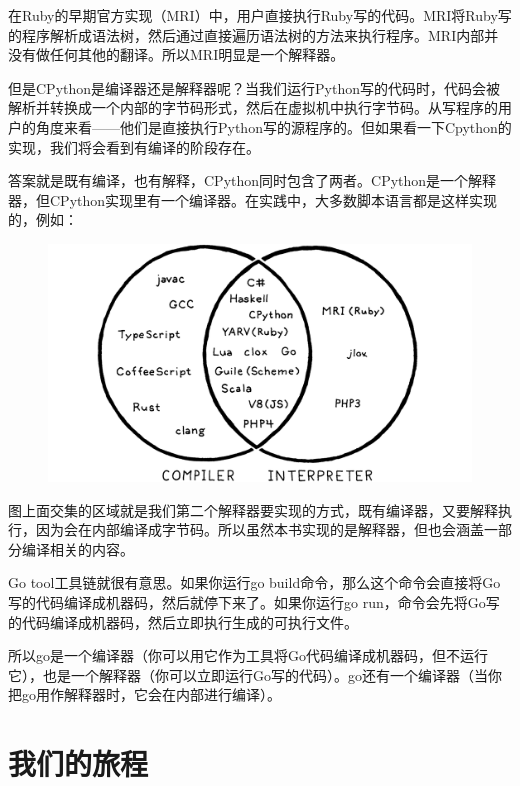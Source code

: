 \documentclass[cn,10pt,math=newtx,citestyle=gb7714-2015,bibstyle=gb7714-2015]{elegantbook}
\begin{document}
在Ruby的早期官方实现（MRI）中，用户直接执行Ruby写的代码。MRI将Ruby写的程序解析成语法树，然后通过直接遍历语法树的方法来执行程序。MRI内部并没有做任何其他的翻译。所以MRI明显是一个解释器。

但是CPython是编译器还是解释器呢？当我们运行Python写的代码时，代码会被解析并转换成一个内部的字节码形式，然后在虚拟机中执行字节码。从写程序的用户的角度来看——他们是直接执行Python写的源程序的。但如果看一下Cpython的实现，我们将会看到有编译的阶段存在。

答案就是既有编译，也有解释，CPython同时包含了两者。CPython是一个解释器，但CPython实现里有一个编译器。在实践中，大多数脚本语言都是这样实现的，例如：

\begin{figure}[h]
\centering
\includegraphics[width=\textwidth]{./image/a-map-of-the-territory/venn.png}
\end{figure}

图上面交集的区域就是我们第二个解释器要实现的方式，既有编译器，又要解释执行，因为会在内部编译成字节码。所以虽然本书实现的是解释器，但也会涵盖一部分编译相关的内容。

\begin{tcolorbox}
Go tool工具链就很有意思。如果你运行go build命令，那么这个命令会直接将Go写的代码编译成机器码，然后就停下来了。如果你运行go run，命令会先将Go写的代码编译成机器码，然后立即执行生成的可执行文件。

所以go是一个编译器（你可以用它作为工具将Go代码编译成机器码，但不运行它），也是一个解释器（你可以立即运行Go写的代码）。go还有一个编译器（当你把go用作解释器时，它会在内部进行编译）。
\end{tcolorbox}

\section{我们的旅程}
\end{document}
